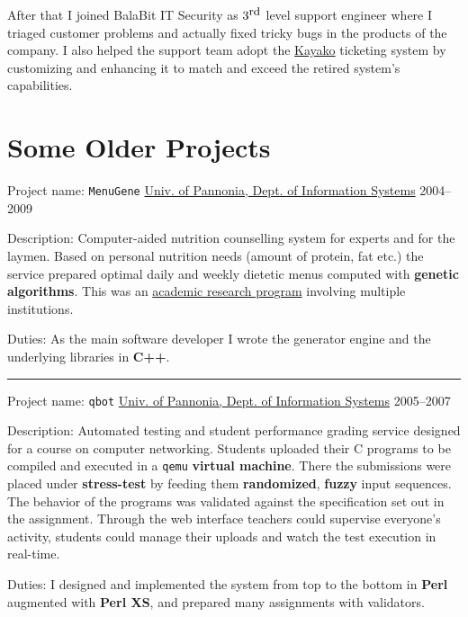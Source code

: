 \documentclass[a4paper,12pt]{article}
\newcommand\Yell{\textbf}
\newcommand\Label{\textsf}
\newcommand{\midline}{\rule[0.5ex]{\linewidth-\parindent}{.5pt}}
\begin{document}
\medskip
After that I joined BalaBit IT Security as $3^{\textrm{\small rd}}$ level
support engineer where I triaged customer problems and actually fixed
tricky bugs in the products of the company.  I also helped the support
team adopt the \href{https://www.kayako.com}{Kayako} ticketing system by
customizing and enhancing it to match and exceed the retired system's
capabilities.

\section{Some Older Projects}

\Label{Project name}: \texttt{MenuGene}\hfill
\href{http://virt.uni-pannon.hu/index.php/en/}%
{Univ. of Pannonia, Dept. of Information Systems}
\Label{2004--2009}\par\medskip
\Label{Description}: Computer-aided nutrition counselling system for experts
and for the laymen.  Based on personal nutrition needs (amount of protein,
fat etc.) the service prepared optimal daily and weekly dietetic menus
computed with \Yell{genetic algorithms}.  This was an
\href{https://github.com/enadam/thesis/raw/master/thesis.pdf}%
{academic research program} involving multiple institutions.\par\medskip
\Label{Duties}: As the main software developer I wrote the generator engine
and the underlying libraries in \Yell{C++}.

\midline\par
\Label{Project name}: \texttt{qbot}\hfill
\href{http://virt.uni-pannon.hu/index.php/en/}%
{Univ. of Pannonia, Dept. of Information Systems}
\Label{2005--2007}\par\medskip
\Label{Description}: Automated testing and student performance grading
service designed for a course on computer networking.  Students uploaded
their C programs to be compiled and executed in a \texttt{qemu} \Yell{virtual
machine}.  There the submissions were placed under \Yell{stress-test} by
feeding them \Yell{randomized}, \Yell{fuzzy} input sequences.  The behavior
of the programs was validated against the specification set out in the
assignment.  Through the web interface teachers could supervise everyone's
activity, students could manage their uploads and watch the test execution
in real-time.
\par\medskip
\Label{Duties}: I designed and implemented the system from top to the bottom
in \Yell{Perl} augmented with \Yell{Perl XS}, and prepared many assignments
with validators.
\end{document}
